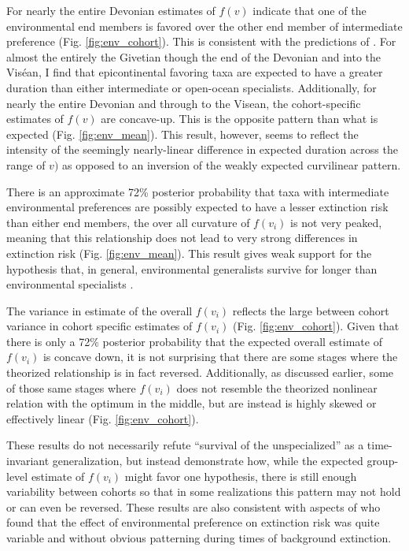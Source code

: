 \documentclass[12pt,letterpaper]{article}
\begin{document}
For nearly the entire Devonian estimates of \(f(v)\) indicate that one of the environmental end members is favored over the other end member of intermediate preference (Fig. \ref{fig:env_cohort}). This is consistent with the predictions of \citet{Miller2009a}. For almost the entirely the Givetian though the end of the Devonian and into the Vis\'{e}an, I find that epicontinental favoring taxa are expected to have a greater duration than either intermediate or open-ocean specialists. Additionally, for nearly the entire Devonian and through to the Visean, the cohort-specific estimates of \(f(v)\) are concave-up. This is the opposite pattern than what is expected (Fig. \ref{fig:env_mean}). This result, however, seems to reflect the intensity of the seemingly nearly-linear difference in expected duration across the range of \(v)\) as opposed to an inversion of the weakly expected curvilinear pattern.

There is an approximate 72\% posterior probability that taxa with intermediate environmental preferences are possibly expected to have a lesser extinction risk than either end members, the over all curvature of \(f(v_{i})\) is not very peaked, meaning that this relationship does not lead to very strong differences in extinction risk (Fig. \ref{fig:env_mean}). This result gives weak support for the hypothesis that, in general, environmental generalists survive for longer than environmental specialists \citep{Simpson1944,Liow2004a,Liow2007b,Nurnberg2013a,Nurnberg2015}.

The variance in estimate of the overall \(f(v_{i})\) reflects the large between cohort variance in cohort specific estimates of \(f(v_{i})\) (Fig. \ref{fig:env_cohort}). Given that there is only a 72\% posterior probability that the expected overall estimate of \(f(v_{i})\) is concave down, it is not surprising that there are some stages where the theorized relationship is in fact reversed. Additionally, as discussed earlier, some of those same stages where \(f(v_{i})\) does not resemble the theorized nonlinear relation with the optimum in the middle, but are instead is highly skewed or effectively linear (Fig. \ref{fig:env_cohort}). 

These results do not necessarily refute ``survival of the unspecialized'' as a time-invariant generalization, but instead demonstrate how, while the expected group-level estimate of \(f(v_{i})\) might favor one hypothesis, there is still enough variability between cohorts so that in some realizations this pattern may not hold or can even be reversed. These results are also consistent with aspects of \citet{Miller2009a} who found that the effect of environmental preference on extinction risk was quite variable and without obvious patterning during times of background extinction.
\end{document}
